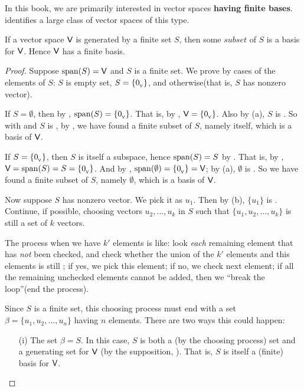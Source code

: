 In this book, we are primarily interested in vector spaces \textbf{having finite bases}.
 identifies a large class of vector spaces of this type.

\begin{theorem} \label{thm 1.9}
If a vector space \(\textsf{V}\) is generated by a finite set \(S\), then some \(subset\) of \(S\) is a basis for \(\textsf{V}\).
Hence \(\textsf{V}\) has a finite basis.
\end{theorem}

\begin{proof}
Suppose \(\operatorname{span}(S) = \textsf{V}\)  and \(S\) is a finite set.
We prove by cases of the elements of \(S\): \(S\) is empty set, \(S = \{ 0_{_{\textsf{V}}} \}\), and otherwise(that is, \(S\) has nonzero vector).

If \(S = \emptyset\), then by , \(\operatorname{span}(S) = \{ 0_{_{\textsf{V}}} \}\).
That is, by , \(\textsf{V} = \{ 0_{_{\textsf{V}}} \}\).
Also by (a), \(S\) is \LID{}.
So with  and \(S\) is \LID{}, by , we have found a finite subset of \(S\), namely itself, which is a basis of \(\textsf{V}\).

If \(S = \{ 0_{_{\textsf{V}}} \}\), then \(S\) is itself a subspace, hence \(\operatorname{span}(S) = S\) by .
That is, by , \(\textsf{V} = \operatorname{span}(S) = S = \{ 0_{_{\textsf{V}}} \}\).
And by , \(\operatorname{span}(\emptyset) = \{ 0_{_{\textsf{V}}} \} = \textsf{V}\);
by (a), \(\emptyset\) is \LID{}.
So we have found a finite subset of \(S\), namely \(\emptyset\), which is a basis of \(\textsf{V}\).

Now suppose \(S\) has nonzero vector.
We pick it as \(u_1\).
Then by (b), \(\{ u_1 \}\) is \LID{}.
Continue, if possible, choosing vectors \(u_2, ..., u_k\) in \(S\) such that \(\{ u_1, u_2, ..., u_k \}\) is still a \LID{} set of \(k\) vectors. 

The process when we have \(k'\) elements is like: look \emph{each} remaining element that has \emph{not} been checked, and check whether the union of the \(k'\) elements and this elements is still \LID{};
if yes, we pick this element;
if no, we check next element;
if all the remaining unchecked elements cannot be added, then we ``break the loop''(end the process).

Since \(S\) is a finite set, this choosing process must end with a \LID{} set \(\beta = \{ u_1, u_2, ..., u_n \}\) having \(n\) elements.
There are two ways this could happen:
\begin{enumerate}
\item[(i)] The set \(\beta = S\).
    In this case, \(S\) is both a \LID{}(by the choosing process) set and a generating set for \(\textsf{V}\) (by the supposition, ).
    That is, \(S\) is itself a (finite) basis for \(\textsf{V}\).


\end{enumerate}
\end{proof}
